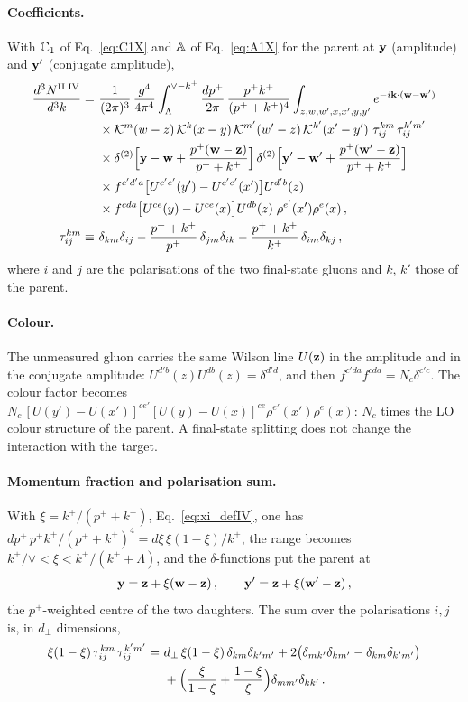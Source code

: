 \paragraph{Coefficients.} With $\mathbb{C}_1$ of Eq.~\eqref{eq:C1X} and $\mathbb{A}$ of Eq.~\eqref{eq:A1X} for the parent at $\mathbf{y}$ (amplitude) and $\mathbf{y}'$ (conjugate amplitude),
\begin{align}\label{eq:ex2_start}
\frac{d^3N^{\rm II.IV}}{d^3k}=\ &\frac{1}{(2\pi)^3}\,\frac{g^4}{4\pi^4}\int_\Lambda^{\vee-k^+}\frac{dp^+}{2\pi}\,\frac{p^+k^+}{(p^++k^+)^4}\int_{z,w,w',x,x',y,y'}e^{-i\v k\cdot(\v w-\v w')}\notag\\
&\times\Kv^m(w-z)\,\Kv^k(x-y)\,\Kv^{m'}(w'-z)\,\Kv^{k'}(x'-y')\,\,\tau^{km}_{ij}\,\tau^{k'm'}_{ij}\notag\\
&\times\delta^{(2)}\Big[\v y-\v w+\frac{p^+(\v w-\v z)}{p^++k^+}\Big]\,\delta^{(2)}\Big[\v y'-\v w'+\frac{p^+(\v w'-\v z)}{p^++k^+}\Big]\notag\\
&\times f^{c'd'a}\big[U^{c'e'}(y')-U^{c'e'}(x')\big]U^{d'b}(z)\notag\\
&\times f^{cda}\big[U^{ce}(y)-U^{ce}(x)\big]U^{db}(z)\;\rho^{e'}(x')\rho^e(x)\,,\notag\\
\tau^{km}_{ij}\equiv\ &\delta_{km}\delta_{ij}-\frac{p^++k^+}{p^+}\,\delta_{jm}\delta_{ik}-\frac{p^++k^+}{k^+}\,\delta_{im}\delta_{kj}\,,
\end{align}
where $i$ and $j$ are the polarisations of the two final-state gluons and $k$, $k'$ those of the parent.

\paragraph{Colour.} The unmeasured gluon carries the same Wilson line $U(\mathbf{z})$ in the amplitude and in the conjugate amplitude: $U^{d'b}(z)U^{db}(z)=\delta^{d'd}$, and then $f^{c'da}f^{cda}=N_c\delta^{c'c}$. The colour factor becomes $N_c\,[U(y')-U(x')]^{ce'}[U(y)-U(x)]^{ce}\rho^{e'}(x')\rho^e(x)$: $N_c$ times the LO colour structure of the parent. A final-state splitting does not change the interaction with the target.

\paragraph{Momentum fraction and polarisation sum.} With $\xi=k^+/(p^++k^+)$, Eq.~\eqref{eq:xi_defIV}, one has $dp^+\,p^+k^+/(p^++k^+)^4=d\xi\,\xi(1-\xi)/k^+$, the range becomes $k^+/\vee<\xi<k^+/(k^++\Lambda)$, and the $\delta$-functions put the parent at
\begin{align}\label{eq:ex2_parent}
\mathbf{y}=\mathbf{z}+\xi(\mathbf{w}-\mathbf{z})\,,\qquad\mathbf{y}'=\mathbf{z}+\xi(\mathbf{w}'-\mathbf{z})\,,
\end{align}
the $p^+$-weighted centre of the two daughters. The sum over the polarisations $i,j$ is, in $d_\perp$ dimensions,
\begin{align}\label{eq:ex2_pol}
\xi(1-\xi)\,\tau^{km}_{ij}\,\tau^{k'm'}_{ij}=\ &d_\perp\,\xi(1-\xi)\,\delta_{km}\delta_{k'm'}+2\big(\delta_{mk'}\delta_{km'}-\delta_{km}\delta_{k'm'}\big)\notag\\&+\Big(\frac{\xi}{1-\xi}+\frac{1-\xi}{\xi}\Big)\delta_{mm'}\delta_{kk'}\,.
\end{align}

